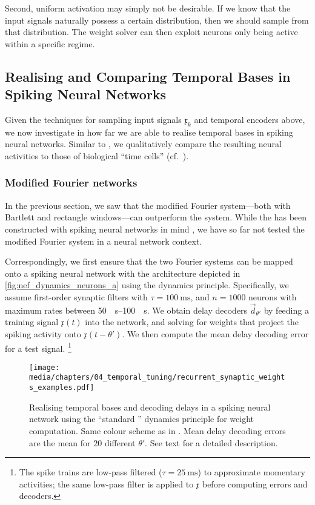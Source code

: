 Second, uniform activation may simply not be desirable.
If we know that the input signals naturally possess a certain distribution, then we should sample from that distribution.
The weight solver can then exploit neurons only being active within a specific regime.

\subsection{Realising and Comparing Temporal Bases in Spiking Neural Networks}
\label{sec:spiking_temporal_bases}

Given the techniques for sampling input signals $\mathfrak{x}_k$ and temporal encoders above, we now investigate in how far we are able to realise temporal bases in spiking neural networks.
Similar to \citet{voelker2018improving}, we qualitatively compare the resulting neural activities to those of biological \enquote{time cells} (cf.~).

\subsubsection{Modified Fourier networks}
In the previous section, we saw that the modified Fourier system---both with Bartlett and rectangle windows---can outperform the \LDN system.
While the \LDN has been constructed with spiking neural networks in mind \citep{voelker2018improving}, we have so far not tested the modified Fourier system in a neural network context.

Correspondingly, we first ensure that the two Fourier systems can be mapped onto a spiking neural network with the architecture depicted in \cref{fig:nef_dynamics_neurons_a} using the \NEF dynamics principle.
Specifically, we assume first-order synaptic filters with $\tau = \SI{100}{\milli\second}$, and $n = 1000$ \LIF neurons with maximum rates between \SIrange{50}{100}{\per\second}.
We obtain delay decoders $\vec d_{\theta'}$ by feeding a training signal $\mathfrak{x}(t)$ into the network, and solving for weights that project the spiking activity onto $\mathfrak{x}(t - \theta')$.
We then compute the mean delay decoding error for a test signal.%
\footnote{
The spike trains are low-pass filtered ($\tau = \SI{25}{\milli\second}$) to approximate momentary activities; the same low-pass filter is applied to $\mathfrak{x}$ before computing errors and decoders.
}
\begin{figure}
	\centering
	\texttt{[image: media/chapters/04\_temporal\_tuning/recurrent\_synaptic\_weights\_examples.pdf]}
	\caption[Realising temporal bases and decoding delays in a spiking neural network]{
	Realising temporal bases and decoding delays in a spiking neural network using the \enquote{standard \NEF} dynamics principle for weight computation.
	Same colour scheme as in .
	Mean delay decoding errors are the mean \NRMSE for $20$ different $\theta'$. See text for a detailed description.
	}
	\label{fig:recurrent_synaptic_weights_examples}
\end{figure}

